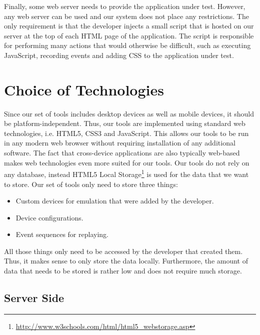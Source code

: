Finally, some web server needs to provide the application under test. However, any web server can be used and our system does not place any restrictions. The only requirement is that the developer injects a small script that is hosted on our server at the top of each HTML page of the application. The script is responsible for performing many actions that would otherwise be difficult, such as executing JavaScript, recording events and adding CSS to the application under test.

\section{Choice of Technologies}

Since our set of tools includes desktop devices as well as mobile devices, it should be platform-independent. Thus, our tools are implemented using standard web technologies, i.e. HTML5, CSS3 and JavaScript. This allows our tools to be run in any modern web browser without requiring installation of any additional software. The fact that cross-device applications are also typically web-based makes web technologies even more suited for our tools. Our tools do not rely on any database, instead HTML5 Local Storage\footnote{\url{http://www.w3schools.com/html/html5_webstorage.asp}} is used for the data that we want to store. Our set of tools only need to store three things:
\begin{itemize}
	\item Custom devices for emulation that were added by the developer.
	\item Device configurations.
	\item Event sequences for replaying.
\end{itemize}
All those things only need to be accessed by the developer that created them. Thus, it makes sense to only store the data locally. Furthermore, the amount of data that needs to be stored is rather low and does not require much storage. 

\subsection{Server Side}

